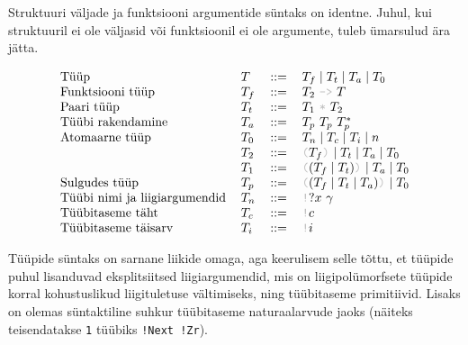 \documentclass[12pt]{article}
\begin{document}
      Struktuuri väljade ja funktsiooni argumentide süntaks on identne. Juhul, kui struktuuril ei ole väljasid või funktsioonil ei ole argumente, tuleb ümarsulud ära jätta.

      \begin{equation*}
        \begin{tabular}{llll}
          Tüüp                          & $T$   & $::=$ & $T_f\mid T_t\mid T_a\mid T_0$                                                          \\
          Funktsiooni tüüp              & $T_f$ & $::=$ & $T_2$ {\color{helehall}\verb!->!} $T$                                                  \\
          Paari tüüp                    & $T_t$ & $::=$ & $T_1$ {\color{helehall}\verb!*!} $T_2$                                                 \\
          Tüübi rakendamine             & $T_a$ & $::=$ & $T_p$ $T_p$ $T_p^*$                                                                    \\
          Atomaarne tüüp                & $T_0$ & $::=$ & $T_n\mid T_c\mid T_i\mid n$                                                            \\
                                        & $T_2$ & $::=$ & {\color{helehall}\verb!(!}$T_f${\color{helehall}\verb!)!} $\mid T_t\mid T_a\mid T_0$   \\
                                        & $T_1$ & $::=$ & {\color{helehall}\verb!(!}$(T_f\mid T_t)${\color{helehall}\verb!)!} $\mid T_a\mid T_0$ \\
          Sulgudes tüüp                 & $T_p$ & $::=$ & {\color{helehall}\verb!(!}$(T_f\mid T_t\mid T_a)${\color{helehall}\verb!)!} $\mid T_0$ \\
          Tüübi nimi ja liigiargumendid & $T_n$ & $::=$ & {\color{helehall}\verb"!"}$?x$ $\gamma$                                                \\
          Tüübitaseme täht              & $T_c$ & $::=$ & {\color{helehall}\verb"!"}$c$                                                          \\
          Tüübitaseme täisarv           & $T_i$ & $::=$ & {\color{helehall}\verb"!"}$i$
        \end{tabular}
      \end{equation*}

      Tüüpide süntaks on sarnane liikide omaga, aga keerulisem selle tõttu, et tüüpide puhul lisanduvad eksplitsiitsed liigiargumendid, mis on liigipolümorfsete tüüpide korral kohustuslikud liigituletuse vältimiseks, ning tüübitaseme primitiivid. Lisaks on olemas süntaktiline suhkur tüübitaseme naturaalarvude jaoks (näiteks teisendatakse \verb!1! tüübiks \verb"!Next !Zr").
\end{document}
